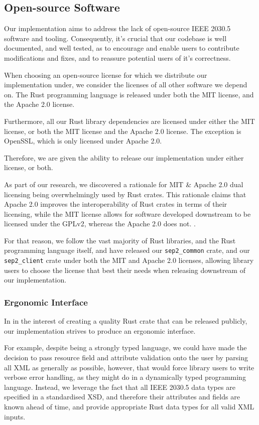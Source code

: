 \subsection{Open-source Software}
Our implementation aims to address the lack of open-source IEEE 2030.5 software and tooling. Consequently, it's crucial that our codebase is well documented, and well tested, as to encourage and enable users to contribute modifications and fixes, and to reassure potential users of it's correctness.

When choosing an open-source license for which we distribute our implementation under, we consider the licenses of all other software we depend on. The Rust programming language is released under both the MIT license, and the Apache 2.0 license. 

Furthermore, all our Rust library dependencies are licensed under either the MIT license, or both the MIT license and the Apache 2.0 license. The exception is OpenSSL, which is only licensed under Apache 2.0.

Therefore, we are given the ability to release our implementation under either license, or both. 

As part of our research, we discovered a rationale for MIT \& Apache 2.0 dual licensing being overwhelmingly used by Rust crates. This rationale claims that Apache 2.0 improves the interoperability of Rust crates in terms of their licensing, while the MIT license allows for software developed downstream to be licensed under the GPLv2, whereas the Apache 2.0 does not. \cite{relicense} \cite{relicensejosh}. 


For that reason, we follow the vast majority of Rust libraries, and the Rust programming language itself, and have released our \texttt{sep2\_common} crate, and our \texttt{sep2\_client} crate under both the MIT and Apache 2.0 licenses, allowing library users to choose the license that best their needs when releasing downstream of our implementation.

\subsubsection{Ergonomic Interface}

In in the interest of creating a quality Rust crate that can be released publicly, our implementation strives to produce an ergonomic interface. 

For example, despite being a strongly typed language, we could have made the decision to pass resource field and attribute validation onto the user by parsing all XML as generally as possible, however, that would force library users to write verbose error handling, as they might do in a dynamically typed programming language. Instead, we leverage the fact that all IEEE 2030.5 data types are specified in a standardised XSD, and therefore their attributes and fields are known ahead of time, and provide appropriate Rust data types for all valid XML inputs.

